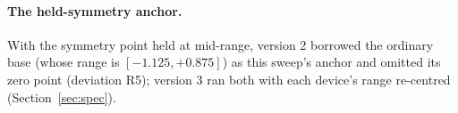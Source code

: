 \paragraph{The held-symmetry anchor.} With the symmetry point held at mid-range, version 2 borrowed the ordinary base (whose range is $[-1.125, +0.875]$) as this sweep's anchor and omitted its zero point (deviation R5);
version 3 ran both with each device's range re-centred (Section~\ref{sec:spec}).


